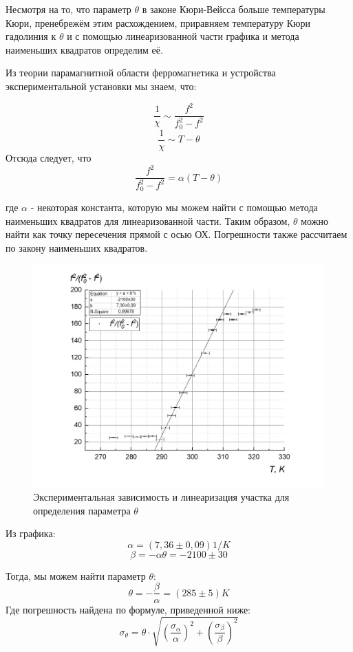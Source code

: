 \documentclass[a4paper, 12pt]{article}%
\begin{document}
Несмотря на то, что параметр $\theta$ в законе Кюри-Вейсса больше температуры Кюри, пренебрежём этим расхождением, приравняем температуру Кюри гадолиния к $\theta$ и с помощью линеаризованной части графика и метода наименьших квадратов определим её.

Из теории парамагнитной области ферромагнетика и устройства экспериментальной установки мы знаем, что:

\[\frac{1}{\chi} \sim \frac{f^2}{f_0^2-f^2}\]
\[\frac{1}{\chi} \sim T - \theta\]
Отсюда следует, что 
\[\frac{f^2}{f_0^2-f^2} = \alpha \left( T - \theta \right)\]

где $\alpha$ - некоторая константа, которую мы можем найти с помощью метода наименьших квадратов для линеаризованной части. Таким образом, $\theta$ можно найти как точку пересечения прямой с осью ОХ. Погрешности также рассчитаем по закону наименьших квадратов.

\begin{figure}[h]
\begin{center}
\includegraphics[width = \textwidth]{5.jpg}
\caption{Экспериментальная зависимость и линеаризация участка для определения параметра $\theta$}
\end{center}
\end{figure}

Из графика:
\[\alpha = (7,36 \pm 0,09) 1/K\]
\[\beta = -\alpha \theta = -2100 \pm 30\]

Тогда, мы можем найти параметр $\theta$:
\[\theta = -\frac{\beta}{\alpha} = (285 \pm 5) K\]
Где погрешность найдена по формуле, приведенной ниже:
\[\sigma_{\theta} = \theta \cdot \sqrt{\left(\frac{\sigma_{\alpha}}{\alpha}\right)^2 + \left(\frac{\sigma_{\beta}}{\beta}\right)^2}\]
\end{document}
